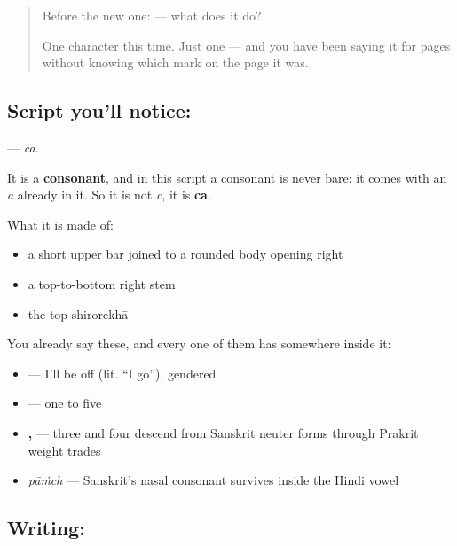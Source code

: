 \label{lesson:HI-S117-letter-ca}



\begin{quote}
Before the new one:  — what does it do?

One character this time. Just one — and you have been saying it for pages without knowing which mark on the page it was.
\end{quote}

\subsection*{Script you'll notice: }
\textbf{} — \emph{ca}.

It is a \textbf{consonant}, and in this script a consonant is never bare: it comes with an \emph{a} already in it. So it is not \emph{c}, it is \textbf{ca}.

What it is made of:

\begin{itemize}
\raggedright
  \item a short upper bar joined to a rounded body opening right
  \item a top-to-bottom right stem
  \item the top shirorekhā
\end{itemize}

You already say these, and every one of them has  somewhere inside it:

\begin{itemize}
\raggedright
  \item \textbf{ } — I'll be off (lit. \textquotedblleft{}I go\textquotedblright{}), gendered
  \item \textbf{    } — one to five
  \item \textbf{, } — three and four descend from Sanskrit neuter forms through Prakrit weight trades
  \item \textbf{} \emph{pāṁch} — Sanskrit's nasal consonant survives inside the Hindi vowel
\end{itemize}

\subsection*{Writing: }

